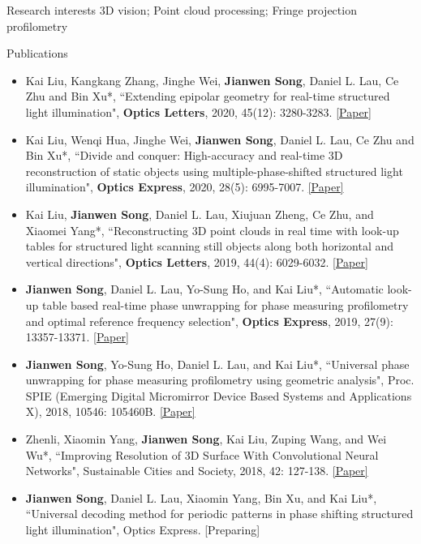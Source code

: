 \documentclass{resume} %
\begin{document}
\begin{rSection}{Research interests}
3D vision; Point cloud processing; Fringe projection profilometry
\end{rSection}
\begin{rSection}{Publications}

\begin{itemize}[leftmargin=*]
\item Kai Liu, Kangkang Zhang, Jinghe Wei, {\bf Jianwen Song}, Daniel L. Lau, Ce Zhu and Bin Xu*, ``Extending epipolar geometry for real-time structured light illumination", {\bf Optics Letters}, 2020, 45(12): 3280-3283. \href{https://www.osapublishing.org/ol/abstract.cfm?uri=ol-45-12-3280}{[Paper]}
\item Kai Liu, Wenqi Hua, Jinghe Wei, {\bf Jianwen Song}, Daniel L. Lau, Ce Zhu and Bin Xu*, ``Divide and conquer: High-accuracy and real-time 3D reconstruction of static objects using multiple-phase-shifted structured light illumination", {\bf Optics Express}, 2020, 28(5): 6995-7007. \href{https://www.osapublishing.org/oe/abstract.cfm?uri=oe-28-5-6995}{[Paper]}
\item Kai Liu, {\bf Jianwen Song}, Daniel L. Lau, Xiujuan Zheng, Ce Zhu, and Xiaomei Yang*, ``Reconstructing 3D point clouds in real time with look-up tables for structured light scanning still objects along both horizontal and vertical directions", {\bf Optics Letters}, 2019, 44(4): 6029-6032. \href{https://www.osapublishing.org/ol/abstract.cfm?uri=ol-44-24-6029}{[Paper]}
\item {\bf Jianwen Song}, Daniel L. Lau, Yo-Sung Ho, and Kai Liu*, ``Automatic look-up table based real-time phase unwrapping for phase measuring profilometry and optimal reference frequency selection", {\bf Optics Express}, 2019, 27(9): 13357-13371. \href{https://www.osapublishing.org/oe/abstract.cfm?uri=oe-27-9-13357}{[Paper]}
\item {\bf Jianwen Song}, Yo-Sung Ho, Daniel L. Lau, and Kai Liu*, ``Universal phase unwrapping for phase measuring profilometry using geometric analysis", Proc. SPIE (Emerging Digital Micromirror Device Based Systems and Applications X), 2018, 10546: 105460B. \href{https://www.spiedigitallibrary.org/conference-proceedings-of-spie/10546/105460B/Universal-phase-unwrapping-for-phase-measuring-profilometry-using-geometry-analysis/10.1117/12.2289423.short?SSO=1}{[Paper]}
\item Zhenli, Xiaomin Yang, {\bf Jianwen Song}, Kai Liu, Zuping Wang, and Wei Wu*, ``Improving Resolution of 3D Surface With Convolutional Neural Networks", Sustainable Cities and Society, 2018, 42: 127-138. \href{https://www.sciencedirect.com/science/article/pii/S2210670718303676}{[Paper]}
\item {\bf Jianwen Song}, Daniel L. Lau, Xiaomin Yang, Bin Xu, and Kai Liu*, ``Universal decoding method for periodic patterns in phase shifting structured light illumination", Optics Express. [Preparing]
\end{itemize}
\end{rSection}
\end{document}
